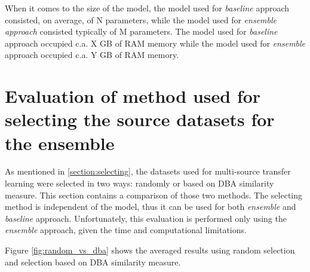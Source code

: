 \documentclass[a4paper,11pt,twoside]{report}
\theoremstyle{definition}
\begin{document}
When it comes to the size of the model, the model used for \textit{baseline} approach consisted, on average, of N parameters, while the model used for \textit{ensemble approach} consisted typically of M parameters. The model used for \textit{baseline} approach occupied c.a. X GB of RAM memory while the model used for \textit{ensemble} approach occupied c.a. Y GB of RAM memory.

\section{Evaluation of method used for selecting the source datasets for the ensemble}
As mentioned in \ref{section:selecting}, the datasets used for multi-source transfer learning were selected in two ways: randomly or based on DBA similarity measure. This section contains a comparison of those two methods. The selecting method is independent of the model, thus it can be used for both \textit{ensemble} and \textit{baseline} approach. Unfortunately, this evaluation is performed only using the \textit{ensemble} approach, given the time and computational limitations.

Figure \ref{fig:random_vs_dba} shows the averaged results using random selection and selection based on DBA similarity measure.
\end{document}
